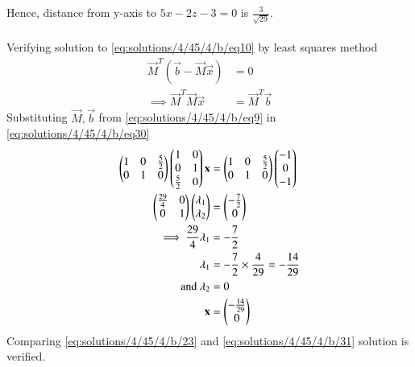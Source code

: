 Hence, distance from y-axis to $5x - 2z - 3 = 0$ is $\frac{3}{\sqrt{29}}$.\\\\
Verifying solution to \eqref{eq:solutions/4/45/4/b/eq10} by least squares method
\begin{align}
	\vec{M}^T(\vec{b} - \vec{M}\vec{x}) &= 0\\
	\label{eq:solutions/4/45/4/b/eq30}\implies \vec{M}^T\vec{M}\vec{x} &= \vec{M}^T\vec{b}
\end{align}
Substituting $\vec{M}, \vec{b}$ from \eqref{eq:solutions/4/45/4/b/eq9} in \eqref{eq:solutions/4/45/4/b/eq30}
\begin{align}
	\begin{pmatrix}1 & 0 & \frac{5}{2}\\0 & 1 & 0\end{pmatrix}\begin{pmatrix}1 & 0\\0 & 1\\\frac{5}{2} & 0\end{pmatrix}\mathbf{x} &= \begin{pmatrix}1 & 0 & \frac{5}{2}\\0 & 1 & 0\end{pmatrix}\begin{pmatrix}-1\\0\\-1\end{pmatrix}\\
	\begin{pmatrix}\frac{29}{4} & 0\\0 & 1\end{pmatrix}\begin{pmatrix}\lambda_1\\\lambda_2\end{pmatrix} &= \begin{pmatrix}-\frac{7}{2}\\0\end{pmatrix}\\
	\implies\frac{29}{4}\lambda_1 &= -\frac{7}{2}\\
	\lambda_1 &= -\frac{7}{2} \times \frac{4}{29} = -\frac{14}{29}\\
	\text{and }\lambda_2 &= 0\\
	\label{eq:solutions/4/45/4/b/31}\mathbf{x} &= \begin{pmatrix}-\frac{14}{29}\\0\end{pmatrix}
\end{align}
Comparing \eqref{eq:solutions/4/45/4/b/23} and \eqref{eq:solutions/4/45/4/b/31} solution is verified.
